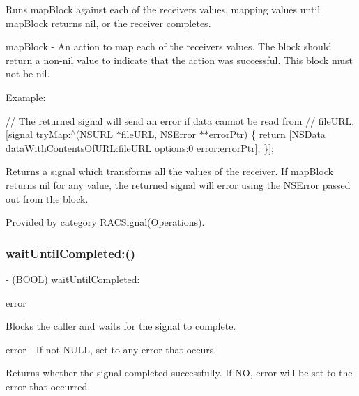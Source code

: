 Runs {\ttfamily map\+Block} against each of the receiver\textquotesingle{}s values, mapping values until {\ttfamily map\+Block} returns nil, or the receiver completes.

map\+Block -\/ An action to map each of the receiver\textquotesingle{}s values. The block should return a non-\/nil value to indicate that the action was successful. This block must not be nil.

Example\+:

// The returned signal will send an error if data cannot be read from // {\ttfamily file\+U\+RL}. \mbox{[}signal try\+Map\+:$^\wedge$(N\+S\+U\+RL $\ast$file\+U\+RL, N\+S\+Error $\ast$$\ast$error\+Ptr) \{ return \mbox{[}N\+S\+Data data\+With\+Contents\+Of\+U\+RL\+:file\+U\+RL options\+:0 error\+:error\+Ptr\mbox{]}; \}\mbox{]};

Returns a signal which transforms all the values of the receiver. If {\ttfamily map\+Block} returns nil for any value, the returned signal will error using the {\ttfamily N\+S\+Error} passed out from the block. 

Provided by category \mbox{\hyperlink{category_r_a_c_signal_07_operations_08_a282c8989886b5b9a75e4ecb298221b58}{R\+A\+C\+Signal(\+Operations)}}.

\mbox{\label{interface_r_a_c_signal_af4c476fc335ca830841bd4fd267f05ce}} 
\subsubsection{\texorpdfstring{wait\+Until\+Completed\+:()}{waitUntilCompleted:()}\hspace{0.1cm}{\footnotesize\ttfamily [1/3]}}
{\footnotesize\ttfamily -\/ (B\+O\+OL) wait\+Until\+Completed\+: \begin{DoxyParamCaption}\item[{(N\+S\+Error $\ast$$\ast$)}]{error }\end{DoxyParamCaption}}

Blocks the caller and waits for the signal to complete.

error -\/ If not N\+U\+LL, set to any error that occurs.

Returns whether the signal completed successfully. If NO, {\ttfamily error} will be set to the error that occurred. 

